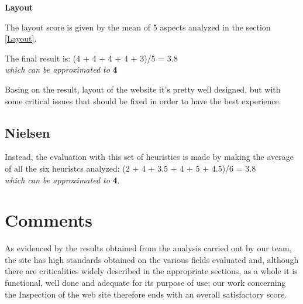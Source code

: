 \par\medskip
\pagebreak
\textbf{Layout}\par
The layout score is given by the mean of 5 aspects analyzed in the section \ref{Layout}. \par
The final result is: 
(4 + 4 + 4 + 4 + 3)/5 = 3.8 \\
\textit{which can be approximated to} \textbf{4}\par
Basing on the result, layout of the website it's pretty well designed, but with some critical issues that should be fixed in order to have the best experience.

\begin{figure}[H]
  \centering
\end{figure}


\subsection{Nielsen}
Instead, the evaluation with this set of heuristics is made by making the average of all the six heuristcs analyzed:
(2 + 4 + 3.5 + 4 + 5 + 4.5)/6 = 3.8 \\
\textit{which can be approximated to} \textbf{4}.\par

\begin{figure}[H]
  \centering
\end{figure}

\section{Comments}
As evidenced by the results obtained from the analysis carried out by our team, the site has high standards obtained on the various fields evaluated and, although there are criticalities widely described in the appropriate sections, as a whole it is functional, well done and adequate for its purpose of use; our work concerning the Inspection of the web site therefore ends with an overall satisfactory score.